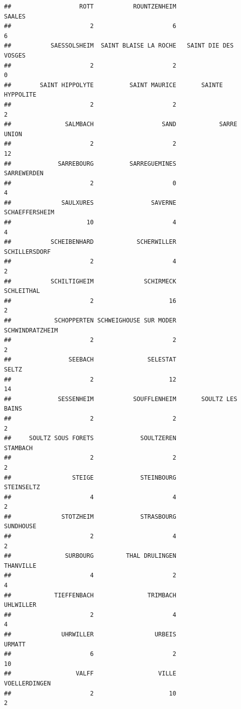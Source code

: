 \documentclass{article}\usepackage[]{graphicx}\usepackage[]{color}
\makeatletter
\newenvironment{kframe}{%
 \def\at@end@of@kframe{}%
 \ifinner\ifhmode%
  \def\at@end@of@kframe{\end{minipage}}%
  \begin{minipage}{\columnwidth}%
 \fi\fi%
 \def\FrameCommand##1{\hskip\@totalleftmargin \hskip-\fboxsep
 \colorbox{shadecolor}{##1}\hskip-\fboxsep
     \hskip-\linewidth \hskip-\@totalleftmargin \hskip\columnwidth}%
 \MakeFramed {\advance\hsize-\width
   \@totalleftmargin\z@ \linewidth\hsize
   \@setminipage}}%
 {\par\unskip\endMakeFramed%
 \at@end@of@kframe}
\newenvironment{knitrout}{}{} %
\makeatother
\begin{document}
\begin{knitrout}
\begin{kframe}
\begin{verbatim}
##                   ROTT           ROUNTZENHEIM                 SAALES 
##                      2                      6                      6 
##           SAESSOLSHEIM  SAINT BLAISE LA ROCHE   SAINT DIE DES VOSGES 
##                      2                      2                      0 
##        SAINT HIPPOLYTE          SAINT MAURICE       SAINTE HYPPOLITE 
##                      2                      2                      2 
##               SALMBACH                   SAND            SARRE UNION 
##                      2                      2                     12 
##             SARREBOURG          SARREGUEMINES            SARREWERDEN 
##                      2                      0                      4 
##              SAULXURES                SAVERNE         SCHAEFFERSHEIM 
##                     10                      4                      4 
##           SCHEIBENHARD            SCHERWILLER          SCHILLERSDORF 
##                      2                      4                      2 
##           SCHILTIGHEIM              SCHIRMECK             SCHLEITHAL 
##                      2                     16                      2 
##            SCHOPPERTEN SCHWEIGHOUSE SUR MODER        SCHWINDRATZHEIM 
##                      2                      2                      2 
##                SEEBACH               SELESTAT                  SELTZ 
##                      2                     12                     14 
##             SESSENHEIM           SOUFFLENHEIM       SOULTZ LES BAINS 
##                      2                      2                      2 
##     SOULTZ SOUS FORETS             SOULTZEREN               STAMBACH 
##                      2                      2                      2 
##                 STEIGE             STEINBOURG             STEINSELTZ 
##                      4                      4                      2 
##              STOTZHEIM             STRASBOURG              SUNDHOUSE 
##                      2                      4                      2 
##               SURBOURG         THAL DRULINGEN              THANVILLE 
##                      4                      2                      4 
##            TIEFFENBACH               TRIMBACH              UHLWILLER 
##                      2                      4                      4 
##              UHRWILLER                 URBEIS                 URMATT 
##                      6                      2                     10 
##                  VALFF                  VILLE          VOELLERDINGEN 
##                      2                     10                      2 

\end{verbatim}
\end{kframe}
\end{knitrout}
\end{document}
